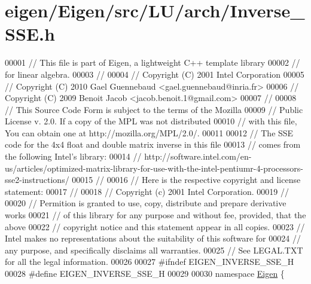 \hypertarget{eigen_2_eigen_2src_2_l_u_2arch_2_inverse___s_s_e_8h_source}{}\section{eigen/\+Eigen/src/\+L\+U/arch/\+Inverse\+\_\+\+S\+SE.h}
\label{eigen_2_eigen_2src_2_l_u_2arch_2_inverse___s_s_e_8h_source}

\begin{DoxyCode}
00001 \textcolor{comment}{// This file is part of Eigen, a lightweight C++ template library}
00002 \textcolor{comment}{// for linear algebra.}
00003 \textcolor{comment}{//}
00004 \textcolor{comment}{// Copyright (C) 2001 Intel Corporation}
00005 \textcolor{comment}{// Copyright (C) 2010 Gael Guennebaud <gael.guennebaud@inria.fr>}
00006 \textcolor{comment}{// Copyright (C) 2009 Benoit Jacob <jacob.benoit.1@gmail.com>}
00007 \textcolor{comment}{//}
00008 \textcolor{comment}{// This Source Code Form is subject to the terms of the Mozilla}
00009 \textcolor{comment}{// Public License v. 2.0. If a copy of the MPL was not distributed}
00010 \textcolor{comment}{// with this file, You can obtain one at http://mozilla.org/MPL/2.0/.}
00011 
00012 \textcolor{comment}{// The SSE code for the 4x4 float and double matrix inverse in this file}
00013 \textcolor{comment}{// comes from the following Intel's library:}
00014 \textcolor{comment}{//
       http://software.intel.com/en-us/articles/optimized-matrix-library-for-use-with-the-intel-pentiumr-4-processors-sse2-instructions/}
00015 \textcolor{comment}{//}
00016 \textcolor{comment}{// Here is the respective copyright and license statement:}
00017 \textcolor{comment}{//}
00018 \textcolor{comment}{//   Copyright (c) 2001 Intel Corporation.}
00019 \textcolor{comment}{//}
00020 \textcolor{comment}{// Permition is granted to use, copy, distribute and prepare derivative works}
00021 \textcolor{comment}{// of this library for any purpose and without fee, provided, that the above}
00022 \textcolor{comment}{// copyright notice and this statement appear in all copies.}
00023 \textcolor{comment}{// Intel makes no representations about the suitability of this software for}
00024 \textcolor{comment}{// any purpose, and specifically disclaims all warranties.}
00025 \textcolor{comment}{// See LEGAL.TXT for all the legal information.}
00026 
00027 \textcolor{preprocessor}{#ifndef EIGEN\_INVERSE\_SSE\_H}
00028 \textcolor{preprocessor}{#define EIGEN\_INVERSE\_SSE\_H}
00029 
00030 \textcolor{keyword}{namespace }\hyperlink{namespace_eigen}{Eigen} \{ 

\end{DoxyCode}
